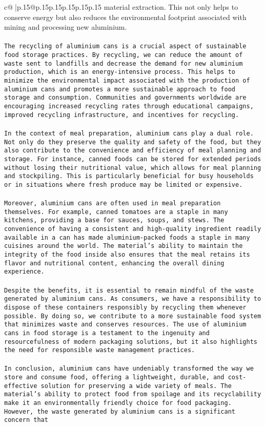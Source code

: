 \documentclass{article}
\begin{document}
{\begin{supertabular}{c@{$\;$}|p{.15\linewidth}@{}p{.15\linewidth}p{.15\linewidth}p{.15\linewidth}p{.15\linewidth}p{.15\linewidth}}
{{{material extraction. This not only helps to conserve energy but also reduces the environmental footprint associated with mining and processing new aluminium.\\ \tt \\ \tt The recycling of aluminium cans is a crucial aspect of sustainable food storage practices. By recycling, we can reduce the amount of waste sent to landfills and decrease the demand for new aluminium production, which is an energy-intensive process. This helps to minimize the environmental impact associated with the production of aluminium cans and promotes a more sustainable approach to food storage and consumption. Communities and governments worldwide are encouraging increased recycling rates through educational campaigns, improved recycling infrastructure, and incentives for recycling.\\ \tt \\ \tt In the context of meal preparation, aluminium cans play a dual role. Not only do they preserve the quality and safety of the food, but they also contribute to the convenience and efficiency of meal planning and storage. For instance, canned foods can be stored for extended periods without losing their nutritional value, which allows for meal planning and stockpiling. This is particularly beneficial for busy households or in situations where fresh produce may be limited or expensive.\\ \tt \\ \tt Moreover, aluminium cans are often used in meal preparation themselves. For example, canned tomatoes are a staple in many kitchens, providing a base for sauces, soups, and stews. The convenience of having a consistent and high-quality ingredient readily available in a can has made aluminium-packed foods a staple in many cuisines around the world. The material's ability to maintain the integrity of the food inside also ensures that the meal retains its flavor and nutritional content, enhancing the overall dining experience.\\ \tt \\ \tt Despite the benefits, it is essential to remain mindful of the waste generated by aluminium cans. As consumers, we have a responsibility to dispose of these containers responsibly by recycling them whenever possible. By doing so, we contribute to a more sustainable food system that minimizes waste and conserves resources. The use of aluminium cans in food storage is a testament to the ingenuity and resourcefulness of modern packaging solutions, but it also highlights the need for responsible waste management practices.\\ \tt \\ \tt In conclusion, aluminium cans have undeniably transformed the way we store and consume food, offering a lightweight, durable, and cost-effective solution for preserving a wide variety of meals. The material's ability to protect food from spoilage and its recyclability make it an environmentally friendly choice for food packaging. However, the waste generated by aluminium cans is a significant concern that }}}
\end{supertabular}}
\end{document}
